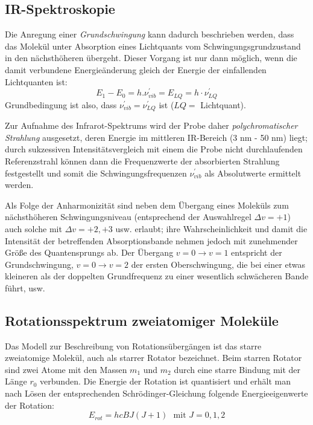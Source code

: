 \documentclass{article}
\begin{document}
\subsection{IR-Spektroskopie}
Die Anregung einer \textit{Grundschwingung} kann dadurch beschrieben werden,
dass das Molekül unter Absorption eines Lichtquants vom 
Schwingungsgrundzustand in den nächsthöheren übergeht.
Dieser Vorgang ist nur dann möglich, 
wenn die damit verbundene Energieänderung 
gleich der Energie der einfallenden Lichtquanten ist:
\begin{equation}
  E _1 - E_0 = h. \nu ^{'}_{vib} = E _{LQ} = h \cdot \nu ^{'}_{LQ}
\end{equation}
Grundbedingung ist also, dass $\nu ^{'}_{vib} = \nu ^{'}_{LQ} $ ist ($LQ =$ Lichtquant). \par
Zur Aufnahme des Infrarot-Spektrums wird der Probe daher \textit{polychromatischer Strahlung} ausgesetzt,
deren Energie im mittleren IR-Bereich (3 \si{\nano\meter} - 50 \si{\nano\meter}) liegt; durch sukzessiven
Intensitätsvergleich mit einem die Probe nicht durchlaufenden Referenzstrahl können dann die Frequenzwerte
der absorbierten Strahlung festgestellt und somit die Schwingungsfrequenzen $\nu ^{'}_{vib} $ als Absolutwerte
ermittelt werden. \par
Als Folge der Anharmonizität sind neben dem Übergang eines Moleküls zum nächsthöheren Schwingungsniveau
(entsprechend der Auswahlregel $ \Delta v = +1$) auch solche mit $ \Delta v = +2, +3$ usw. erlaubt;
ihre Wahrscheinlichkeit und damit die Intensität der betreffenden Absorptionsbande nehmen
jedoch mit zunehmender Größe des Quantensprungs ab. Der Übergang $v =0 \rightarrow v =1$ entspricht der Grundschwingung,
$ v =0 \rightarrow v=2 $ der ersten Oberschwingung, die bei einer etwas kleineren als der doppelten Grundfrequenz
zu einer wesentlich schwächeren Bande führt, usw.
\subsection{Rotationsspektrum zweiatomiger Moleküle~\supercite{rovib}}
Das Modell zur Beschreibung von Rotationsübergängen 
ist das starre zweiatomige Molekül, auch als starrer Rotator bezeichnet. 
Beim starren Rotator sind zwei Atome mit den Massen $m_1$ und $m_2$ 
durch eine starre Bindung mit der Länge $r_0$ verbunden. 
Die Energie der Rotation ist quantisiert und erhält man nach Lösen 
der entsprechenden Schrödinger-Gleichung folgende Energieeigenwerte der Rotation:
\begin{equation}
\label{eq:erot}
E_{rot} = hc B J (J+1) \,\, \text{ mit } J = 0, 1,2 
\end{equation}
\end{document}
